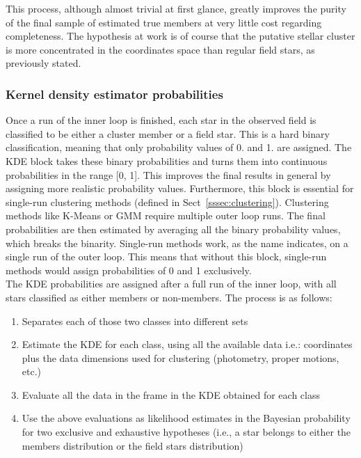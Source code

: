 \documentclass{aa}
\begin{document}
 This process, although almost trivial at first glance, greatly improves the
 purity of the final sample of estimated true members at very little cost
 regarding completeness. The hypothesis at work is of course that the putative
 stellar cluster is more concentrated in the coordinates space than regular
 field stars, as previously stated.



\subsubsection{Kernel density estimator probabilities}
 \label{sssec:kde-probs}

 Once a run of the inner loop is finished, each star in the observed field is
 classified to be either a cluster member or a field star. This is a hard
 binary classification, meaning that only probability values of 0. and 1. are
 assigned. The KDE block takes these binary probabilities and turns them into
 continuous probabilities in the range [0, 1]. This improves the final results
 in general by assigning more realistic probability values. Furthermore, this
 block is essential for single-run clustering methods (defined in
 Sect~\ref{sssec:clustering}). Clustering methods like K-Means or GMM
 require multiple outer loop runs. The final probabilities are then estimated
 by averaging all the binary probability values, which breaks the binarity.
 Single-run methods work, as the name indicates, on a single run of the outer
 loop. This means that without this block, single-run methods would assign
 probabilities of 0 and 1 exclusively.\\

 The KDE probabilities are assigned after a full run of the inner loop, with
 all stars classified as either members or non-members. The process is as
 follows:

 \begin{enumerate}
  \item Separates each of those two classes into different sets
  \item Estimate the KDE for each class, using all the available data i.e.:
  coordinates plus the data dimensions used for clustering (photometry, proper
  motions, etc.)
  \item Evaluate all the data in the frame in the KDE obtained for each class
  \item Use the above evaluations as likelihood estimates in the Bayesian
  probability for two exclusive and exhaustive hypotheses (i.e., a star
  belongs to either the members distribution or the field stars distribution)
 \end{enumerate}
\end{document}
